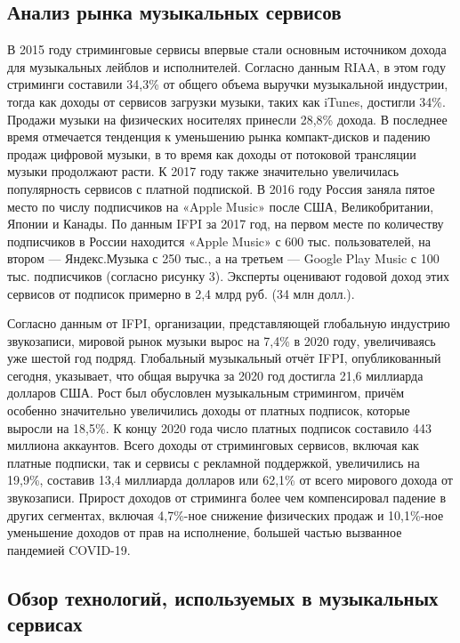 \subsection{Анализ рынка музыкальных сервисов}

В 2015 году стриминговые сервисы впервые стали основным источником дохода для музыкальных лейблов и исполнителей. Согласно данным RIAA, в этом году стриминги составили 34,3\% от общего объема выручки музыкальной индустрии, тогда как доходы от сервисов загрузки музыки, таких как iTunes, достигли 34\%. Продажи музыки на физических носителях принесли 28,8\% дохода.
В последнее время отмечается тенденция к уменьшению рынка компакт-дисков и падению продаж цифровой музыки, в то время как доходы от потоковой трансляции музыки продолжают расти. К 2017 году также значительно увеличилась популярность сервисов с платной подпиской. В 2016 году Россия заняла пятое место по числу подписчиков на «Apple Music» после США, Великобритании, Японии и Канады. По данным IFPI за 2017 год, на первом месте по количеству подписчиков в России находится «Apple Music» с 600 тыс. пользователей, на втором — Яндекс.Музыка с 250 тыс., а на третьем — Google Play Music с 100 тыс. подписчиков (согласно рисунку 3). Эксперты оценивают годовой доход этих сервисов от подписок примерно в 2,4 млрд руб. (34 млн долл.)\cite{mus2}.

Согласно данным от IFPI, организации, представляющей глобальную индустрию звукозаписи, мировой рынок музыки вырос на 7,4\% в 2020 году, увеличиваясь уже шестой год подряд. Глобальный музыкальный отчёт IFPI, опубликованный сегодня, указывает, что общая выручка за 2020 год достигла 21,6 миллиарда долларов США.
Рост был обусловлен музыкальным стримингом, причём особенно значительно увеличились доходы от платных подписок, которые выросли на 18,5\%. К концу 2020 года число платных подписок составило 443 миллиона аккаунтов. Всего доходы от стриминговых сервисов, включая как платные подписки, так и сервисы с рекламной поддержкой, увеличились на 19,9\%, составив 13,4 миллиарда долларов или 62,1\% от всего мирового дохода от звукозаписи. Прирост доходов от стриминга более чем компенсировал падение в других сегментах, включая 4,7\%-ное снижение физических продаж и 10,1\%-ное уменьшение доходов от прав на исполнение, большей частью вызванное пандемией COVID-19\cite{ifpi}.

\subsection{Обзор технологий, используемых в музыкальных сервисах}

